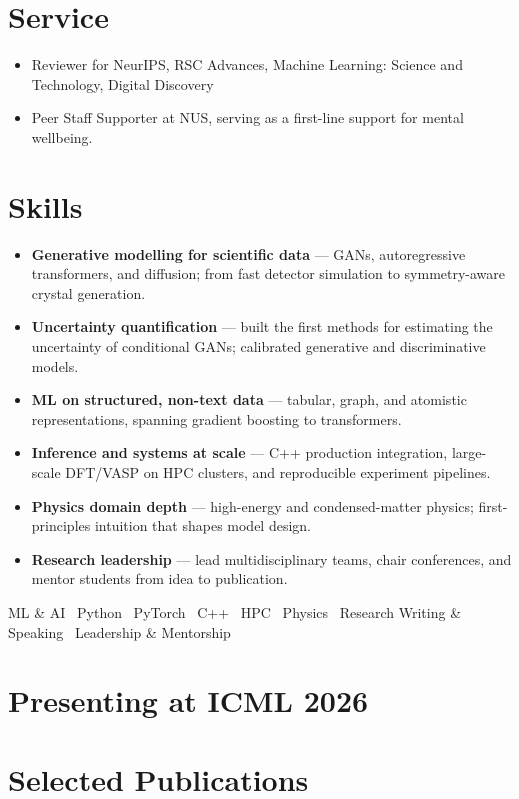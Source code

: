 \documentclass[11pt,a4paper]{article}
\begin{document}
\section{Service}
\begin{itemize}
  \item Reviewer for NeurIPS, RSC Advances, Machine Learning: Science and Technology, Digital Discovery
  \item Peer Staff Supporter at NUS, serving as a first-line support for mental wellbeing.
\end{itemize}

\newpage

\section{Skills}
\begin{itemize}
  \item \textbf{Generative modelling for scientific data} --- GANs, autoregressive transformers, and diffusion; from fast detector simulation to symmetry-aware crystal generation.
  \item \textbf{Uncertainty quantification} --- built the first methods for estimating the uncertainty of conditional GANs; calibrated generative and discriminative models.
  \item \textbf{ML on structured, non-text data} --- tabular, graph, and atomistic representations, spanning gradient boosting to transformers.
  \item \textbf{Inference and systems at scale} --- C++ production integration, large-scale DFT/VASP on HPC clusters, and reproducible experiment pipelines.
  \item \textbf{Physics domain depth} --- high-energy and condensed-matter physics; first-principles intuition that shapes model design.
  \item \textbf{Research leadership} --- lead multidisciplinary teams, chair conferences, and mentor students from idea to publication.
\end{itemize}
{\small\centering ML \& AI \textbullet\ Python \textbullet\ PyTorch \textbullet\ C++ \textbullet\ HPC \textbullet\ Physics \textbullet\ Research Writing \& Speaking \textbullet\ Leadership \& Mentorship\par}

\nocite{*}
\section{Presenting at ICML 2026}
\printbibliography[filter=cvicml,heading=none,resetnumbers=true]

\section{Selected Publications}
\printbibliography[filter=cvselected,heading=none,resetnumbers=true]
\end{document}
